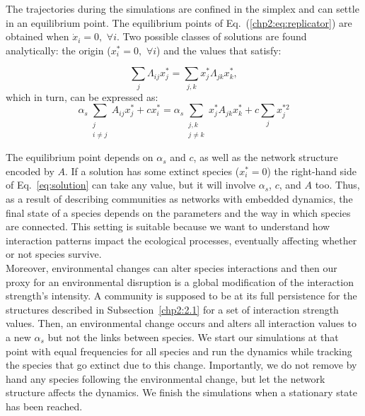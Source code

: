 The trajectories during the simulations are confined in the simplex and can settle in an equilibrium point. The equilibrium points of Eq.~(\ref{chp2:eq:replicator}) are obtained when $\dot{x}_i = 0, \, \, \forall i$. Two possible classes of solutions are found analytically: the origin (${x}^*_i = 0, \, \, \forall i$) and the values that satisfy:

\begin{equation}
    \sum_j \Lambda_{ij} x^*_j = \sum_{j,k} x^*_j \Lambda_{jk} x^*_k ,
\end{equation}
 which in turn, can be expressed as:
\begin{equation}
    \alpha_s \sum_{\substack{j \\ i\neq j} } A_{ij} x^*_j + c x^*_i = \alpha_s \sum_{\substack{j,k\\ j\neq k} } x^*_j A_{jk} x^*_k + c \sum_j x^{*2}_j
    \label{eq:solution}
\end{equation}

The equilibrium point depends on $\alpha_s$ and $c$, as well as the network structure encoded by $A$.  
If a solution has some extinct species (${x}^*_i = 0$) the right-hand side of Eq.~\eqref{eq:solution} can take any value, but it will involve $\alpha_s$, $c$, and $A$ too. Thus, as a result of describing communities as networks with embedded dynamics, the final state of a species depends on the parameters and the way in which species are connected. This setting is suitable because we want to understand how interaction patterns impact the ecological processes, eventually affecting whether or not species survive.\\

Moreover, environmental changes can alter species interactions \cite{Sun2022ExperimentalWetland,tabi2020species} and then our proxy for an environmental disruption is a global modification of the interaction strength's intensity. A community is supposed to be at its full persistence for the structures described in Subsection~\ref{chp2:2.1} for a set of interaction strength values. Then, an environmental change occurs and alters all interaction values to a new $\alpha_s$ but not the links between species. We start our simulations at that point with equal frequencies for all species and run the dynamics while tracking the species that go extinct  due to this change. Importantly, we do not remove by hand any species following the environmental change, but let the network structure affects the dynamics. We finish the simulations when a stationary state has been reached. 


